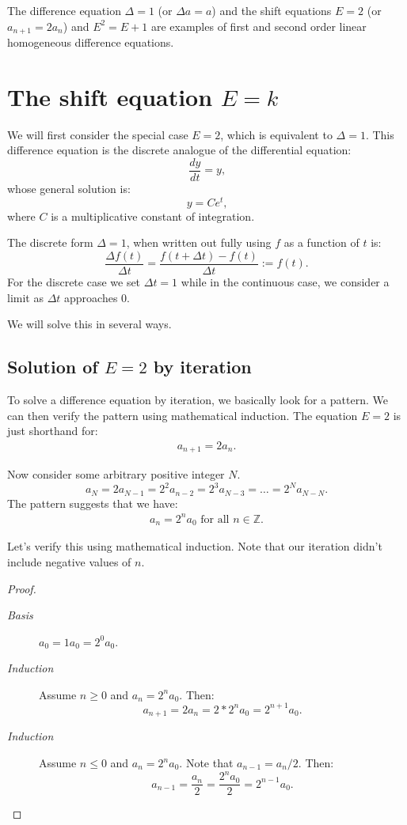 \documentclass[12pt,letterpaper,reqno]{amsart}
\numberwithin{equation}{section}
\numberwithin{theorem}{section}
\numberwithin{table}{section}
\begin{document}
The difference equation $\Delta=1$ (or $\Delta a=a$) and the shift equations $E=2$ (or $a_{n+1}=2a_n$) and $E^2=E+1$ are examples of first and second order linear homogeneous difference equations.

\section{The shift equation $E=k$}

We will first consider the special case $E=2$, which is equivalent to $\Delta=1$.  This difference equation is the discrete analogue of the differential equation:
\[
	\frac{dy}{dt} = y \text{,}
\]
whose general solution is:
\[
	y = Ce^t \text{,}
\]
where $C$ is a multiplicative constant of integration.

The discrete form $\Delta=1$, when written out fully using $f$ as a function of $t$ is:
\[
	\frac{\Delta f(t)}{\Delta t} = \frac{f(t+\Delta t) - f(t)}{\Delta t} := f(t)\text{.}
\]
For the discrete case we set $\Delta t=1$ while in the continuous case, we consider a limit as
$\Delta t$ approaches 0. 

We will solve this in several ways.
 
 \subsection{Solution of $E=2$ by iteration}
 
 To solve a difference equation by iteration, we basically look for a pattern.  We can then verify the pattern using mathematical induction.  The equation $E=2$ is just shorthand for:
 \begin{align}
 	a_{n+1} = 2a_n
 	\text{.}
 \end{align}

Now consider some arbitrary positive integer $N$.
\[
	a_N = 2a_{N-1} = 2^2 a_{n-2} = 2^3 a_{N-3} = \dots = 2^N a_{N-N}
	\text{.} 
\]
The pattern suggests that we have:
\begin{align}
	a_n = 2^n a_0
	\text{ for all $n\in\mathbb{Z}$.}
\end{align}

Let's verify this using mathematical induction.  Note that our iteration didn't include negative values of $n$.
\begin{proof}
	\ \\[-1em]
	\begin{description}
		\item[\it Basis] $a_0 = 1 a_0 = 2^0 a_0$.
		\item[\it Induction] Assume $n\geq 0$ and $a_n=2^n a_0$.
			Then:
			\[ a_{n+1} = 2a_n = 2*2^na_0 = 2^{n+1} a_0 \text{.} \]
		\item[\it Induction]  Assume $n\leq 0$ and $a_n=2^n a_0$.
			Note that $a_{n-1} = a_n/2$.
			Then:
			\[ a_{n-1} = \frac{a_n}{2} = \frac{2^n a_0}{2} = 2^{n-1} a_0 \text{.} \]
	\end{description}
\end{proof}
\end{document}
